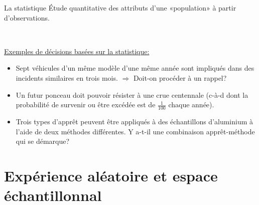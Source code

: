 \documentclass{BeamerTemplate}
\begin{document}
\begin{frame}[t]%
 \begin{Boite}{La statistique}
 Étude  quantitative des attributs d'une «population» à partir  d'observations.
 \end{Boite}

 \medskip
 {\ }

\end{frame}
\begin{frame}[t]%

\underline{Exemples de décisions basées sur la statistique:}

 \begin{itemize}
  \item  Sept véhicules d'un même modèle d'une même   année sont impliqués dans des incidents similaires en trois mois. $\Rightarrow$ Doit-on procéder à   un rappel?
  \item  Un futur ponceau doit pouvoir résister à une crue centennale (c-à-d dont la probabilité de survenir ou être excédée est de $\frac{1}{100}$ chaque année).
  \item  Trois types d'apprêt   peuvent être appliqués à des échantillons   d'aluminium  à l'aide de  deux méthodes différentes. Y a-t-il une   combinaison apprêt-méthode  qui se démarque?
 \end{itemize}
\end{frame}


\section[Expérience aléatoire]{Expérience aléatoire et espace échantillonnal}

\end{document}
